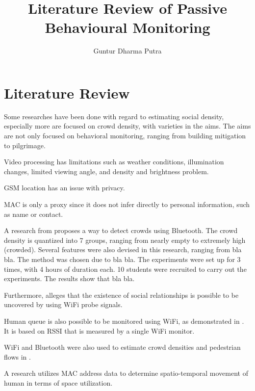\documentclass{article}
\begin{document}
\title{Literature Review of Passive Behavioural Monitoring}
\author{Guntur Dharma Putra}

\maketitle


\section{Literature Review}
Some researches have been done with regard to estimating social density, especially more are focused on crowd density, with varieties in the aims. The aims are not only focused on behavioral monitoring, ranging from building mitigation to pilgrimage.

Video processing has limitations such as weather conditions, illumination changes, limited viewing angle, and density and brightness problem. 

GSM location has an issue with privacy\cite{thesis017}.

MAC is only a proxy since it does not infer directly to personal information, such as name or contact.

A research from \cite{thesis008} proposes a way to detect crowds using Bluetooth. The crowd density is quantized into 7 groups, ranging from nearly empty to extremely high (crowded). Several features were also devised in this research, ranging from bla bla. 
The method was chosen due to bla bla.
The experiments were set up for 3 times, with 4 hours of duration each. 10 students were recruited to carry out the experiments.
The results show that bla bla.

Furthermore, \cite{thesis014} alleges that the existence of social relationships is possible to be uncovered by using WiFi probe signals.

Human queue is also possible to be monitored using WiFi, as demonstrated in \cite{thesis012}. It is based on RSSI that is measured by a single WiFi monitor.

WiFi and Bluetooth were also used to estimate crowd densities and pedestrian flows in \cite{thesis011}.

A research \cite{thesis017} utilizes MAC address data to determine spatio-temporal movement of human in terms of space utilization.
\end{document}
